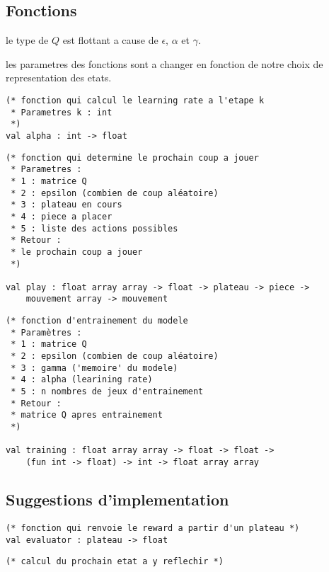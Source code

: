 \documentclass{article}
\begin{document}
\subsection{Fonctions}

\danger{} le type de \( Q \) est flottant a cause de \( \epsilon \), \( \alpha \) et \( \gamma \).

\noindent
\danger{} les parametres des fonctions sont a changer en fonction de notre
choix de representation des etats.

\begin{lstlisting}[frame=L]
(* fonction qui calcul le learning rate a l'etape k
 * Parametres k : int
 *)
val alpha : int -> float
\end{lstlisting}


\begin{lstlisting}[frame=L]
(* fonction qui determine le prochain coup a jouer
 * Parametres :
 * 1 : matrice Q
 * 2 : epsilon (combien de coup aléatoire)
 * 3 : plateau en cours
 * 4 : piece a placer
 * 5 : liste des actions possibles
 * Retour :
 * le prochain coup a jouer
 *)

val play : float array array -> float -> plateau -> piece ->
	mouvement array -> mouvement
\end{lstlisting}

\begin{lstlisting}[frame=L]
(* fonction d'entrainement du modele
 * Paramètres :
 * 1 : matrice Q
 * 2 : epsilon (combien de coup aléatoire)
 * 3 : gamma ('memoire' du modele)
 * 4 : alpha (learining rate)
 * 5 : n nombres de jeux d'entrainement
 * Retour :
 * matrice Q apres entrainement
 *)

val training : float array array -> float -> float ->
	(fun int -> float) -> int -> float array array
\end{lstlisting}

\subsection{Suggestions d'implementation}

\begin{lstlisting}[frame=L]
(* fonction qui renvoie le reward a partir d'un plateau *)
val evaluator : plateau -> float
\end{lstlisting}

\begin{lstlisting}
(* calcul du prochain etat a y reflechir *)
\end{lstlisting}
\end{document}
